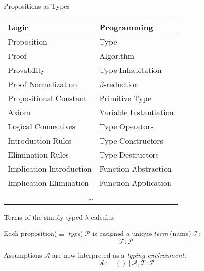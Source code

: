 \documentclass{beamer}
\begin{document}
\begin{frame}{Propositions as Types}

	\footnotesize
	\centering
	\begin{tabularx}{0.825\textwidth}{@{}CC}
	\textbf{Logic} & \textbf{Programming}\\	
	\toprule
	Proposition & Type \\
	Proof & Algorithm \\
	Provability & Type Inhabitation \\ 
	Proof Normalization & $\beta$-reduction \\
	\midrule
	Propositional Constant & Primitive Type \\
	Axiom & Variable Instantiation \\
	Logical Connectives & Type Operators \\ 
	Introduction Rules & Type Constructors \\
	Elimination Rules & Type Destructors \\
	Implication Introduction & Function Abstraction \\
	Implication Elimination & Function Application \\
	 \\
	\end{tabularx} 	
\end{frame}

\begin{frame}{Terms of the simply typed $\lambda$-calculus}
	\small
	
	Each proposition($\equiv$ \textit{type}) $\mathcal{P}$ is assigned a unique \textit{term} (name) $\mathcal{T}$:
	\[
		\mathcal{T}: \mathcal{P}
	\]
	\vfill
	
	Assumptions $\mathcal{A}$ are now interpreted as a \textit{typing environment}:
	\[
		\mathcal{A} := ( ) \ | \ \mathcal{A}, \mathcal{T}: \mathcal{P}
	\]
	
\end{frame}
\end{document}
